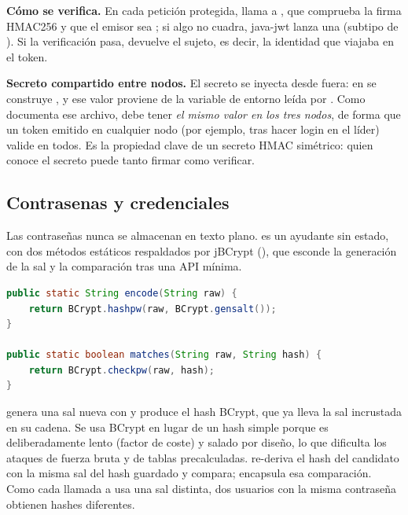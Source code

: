\textbf{Cómo se verifica.} En cada petición protegida, 
llama a , que comprueba la firma HMAC256 y que el
emisor sea ; si algo no cuadra, java-jwt lanza una
 (subtipo de ). Si la
verificación pasa, devuelve el sujeto, es decir, la identidad que viajaba en el
token.

\textbf{Secreto compartido entre nodos.} El secreto se inyecta desde fuera: en
 se construye , y ese
valor proviene de la variable de entorno  leída por
. Como documenta ese archivo, 
debe tener \emph{el mismo valor en los tres nodos}, de forma que un token emitido
en cualquier nodo (por ejemplo, tras hacer login en el líder) valide en todos. Es
la propiedad clave de un secreto HMAC simétrico: quien conoce el secreto puede
tanto firmar como verificar.

\subsection{Contrasenas y credenciales}

Las contraseñas nunca se almacenan en texto plano. 
es un ayudante sin estado, con dos métodos estáticos respaldados por jBCrypt
(), que esconde la generación de la sal y la
comparación tras una API mínima.

\begin{lstlisting}[language=Java,caption={Passwords: hash y verificacion con BCrypt}]
public static String encode(String raw) {
    return BCrypt.hashpw(raw, BCrypt.gensalt());
}

public static boolean matches(String raw, String hash) {
    return BCrypt.checkpw(raw, hash);
}
\end{lstlisting}

 genera una sal nueva con  y produce
el hash BCrypt, que ya lleva la sal incrustada en su cadena. Se usa BCrypt en
lugar de un hash simple porque es deliberadamente lento (factor de coste) y salado
por diseño, lo que dificulta los ataques de fuerza bruta y de tablas
precalculadas.  re-deriva el hash del candidato con la
misma sal del hash guardado y compara;  encapsula esa
comparación. Como cada llamada a  usa una sal distinta, dos
usuarios con la misma contraseña obtienen hashes diferentes.

